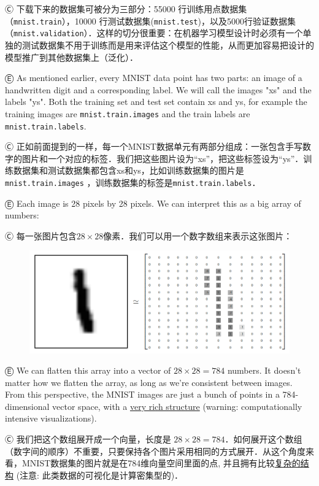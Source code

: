 Ⓒ 下载下来的数据集可被分为三部分：55000 行训练用点数据集（\lstinline{mnist.train}），10000 行测试数据集(\lstinline{mnist.test})，以及5000行验证数据集（\lstinline{mnist.validation}）．这样的切分很重要：在机器学习模型设计时必须有一个单独的测试数据集不用于训练而是用来评估这个模型的性能，从而更加容易把设计的模型推广到其他数据集上（泛化）．

Ⓔ \textcolor{etc}{As mentioned earlier, every MNIST data point has two parts: an image of a handwritten digit and a corresponding label. We will call the images "xs" and the labels "ys". Both the training set and test set contain xs and ys, for example the training images are \lstinline{mnist.train.images} and the train labels are \lstinline{mnist.train.labels}.}

Ⓒ 正如前面提到的一样，每一个MNIST数据单元有两部分组成：一张包含手写数字的图片和一个对应的标签．我们把这些图片设为“xs”，把这些标签设为“ys”．训练数据集和测试数据集都包含xs和ys，比如训练数据集的图片是\lstinline{mnist.train.images} ，训练数据集的标签是\lstinline{mnist.train.labels}．

Ⓔ \textcolor{etc}{Each image is 28 pixels by 28 pixels. We can interpret this as a big array of numbers:}

Ⓒ 每一张图片包含$ 28 \times 28$像素．我们可以用一个数字数组来表示这张图片：

\begin{figure}[htbp]
\centering
\includegraphics[width=.8\textwidth]{../SOURCE/images/MNIST-Matrix.png}
\caption{}
\end{figure}

Ⓔ \textcolor{etc}{We can flatten this array into a vector of $ 28 \times 28 = 784$ numbers. It doesn't matter how we flatten the array, as long as we're consistent between images. From this perspective, the MNIST images are just a bunch of points in a 784-dimensional vector space, with a \href{http://colah.github.io/posts/2014-10-Visualizing-MNIST/}{very rich structure} (warning: computationally intensive visualizations).}

Ⓒ 我们把这个数组展开成一个向量，长度是 $ 28 \times 28 = 784$．如何展开这个数组（数字间的顺序）不重要，只要保持各个图片采用相同的方式展开．从这个角度来看，MNIST数据集的图片就是在784维向量空间里面的点, 并且拥有比较\href{http://colah.github.io/posts/2014-10-Visualizing-MNIST/}{复杂的结构} (注意: 此类数据的可视化是计算密集型的)．

